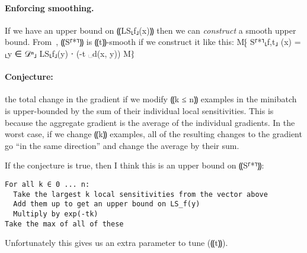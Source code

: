 \documentclass{article}
\begin{document}
\paragraph{Enforcing smoothing.}
If we have an upper bound on ⸨LS⸤f⸥(x)⸩ then we can \emph{construct} a
smooth upper bound. From~\cite{smooth-sensitivity}, ⸨S⸢*⸣⸩ is
⸨t⸩-smooth if we construct it like this:
%
M⁅ S⸢*⸣⸤f,t⸥ (x) = \max⸤y ∈ 𝒟ⁿ⸥ LS⸤f⸥(y) ⋅ \exp(-t ␣d(x, y))
M⁆

\paragraph{Conjecture:} the total change in the gradient if we modify
⸨k ≤ n⸩ examples in the minibatch is upper-bounded by the sum of their
individual local sensitivities. This is because the aggregate gradient
is the average of the individual gradients. In the worst case, if we
change ⸨k⸩ examples, all of the resulting changes to the gradient go
``in the same direction'' and change the average by their sum.


If the conjecture is true, then I think this is an upper bound on ⸨S⸢*⸣⸩:

\begin{verbatim}
For all k ∈ 0 ... n:
  Take the largest k local sensitivities from the vector above
  Add them up to get an upper bound on LS_f(y)
  Multiply by exp(-tk)
Take the max of all of these
\end{verbatim}

Unfortunately this gives us an extra parameter to tune (⸨t⸩).



\end{document}
